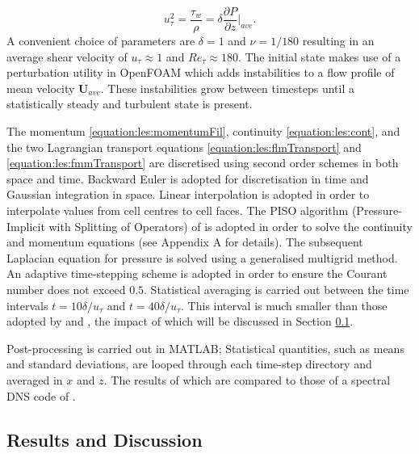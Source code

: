 \documentclass[12pt,oneside,a4paper]{article}
\newcommand{\pdev}[2]{\frac{\partial {#1}}{\partial {#2}}}
\newcommand{\vect}[1]{\boldsymbol{#1}}
\begin{document}
\begin{equation}
u_\tau^2 = \frac{\tau_w}{\rho} = \delta \pdev{P}{z}\bigg\vert_{ave}.
\end{equation}
A convenient choice of parameters are $\delta = 1$ and $\nu = 1/180$ resulting in an average shear velocity of $u_\tau \approx 1$ and $Re_\tau \approx 180$. The initial state makes use of a perturbation utility in OpenFOAM which adds instabilities to a flow profile of mean velocity $ \overline{\vect{U}}_{ave} $. These instabilities grow between timesteps until a statistically steady and turbulent state is present. 

The momentum \eqref{equation:les:momentumFil}, continuity \eqref{equation:les:cont}, and the two Lagrangian transport equations \eqref{equation:les:flmTransport} and \eqref{equation:les:fmmTransport} are discretised using second order schemes in both space and time. Backward Euler is adopted for discretisation in time and Gaussian integration in space. Linear interpolation is adopted in order to interpolate values from cell centres to cell faces. The PISO algorithm (Pressure-Implicit with Splitting of Operators) of \cite{issa1986} is adopted in order to solve the continuity and momentum equations (see Appendix A for details). The subsequent Laplacian equation for pressure is solved using a generalised multigrid method. An adaptive time-stepping scheme is adopted in order to ensure the Courant number does not exceed $0.5$. Statistical averaging is carried out between the time intervals $t=10 \delta / u_\tau$ and $t = 40 \delta / u_\tau$. This interval is much smaller than those adopted by \cite{kim1987} and \cite{vreman2014}, the impact of which will be discussed in Section \ref{section:lesResults}.

Post-processing is carried out in MATLAB; Statistical quantities, such as means and standard deviations, are looped through each time-step directory and averaged in $x$ and $z$. The results of which are compared to those of a spectral DNS code of \cite{vreman2014}.

\subsection{Results and Discussion}
\label{section:lesResults}
\end{document}
